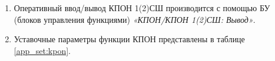 \begin{enumerate}
\item
Оперативный ввод/вывод КПОН 1(2)СШ производится с помощью БУ (блоков управления функциями) \textit{«КПОН/КПОН 1(2)СШ: Вывод»}. 

\item
Уставочные параметры функции КПОН представлены в таблице \ref{app_set:kpon}.

\end{enumerate}